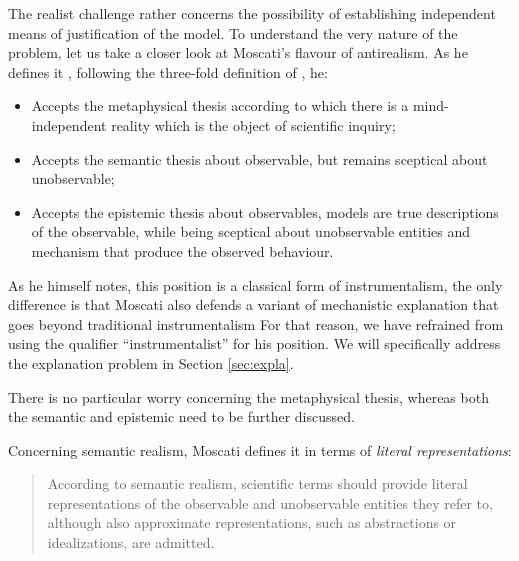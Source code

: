 \documentclass[a4paper,11pt]{article}
\theoremstyle{definition}
\begin{document}
The realist challenge rather concerns the possibility of establishing independent means of justification of the model. To understand the very nature of the problem, let us take a closer look at Moscati's flavour of antirealism. As he defines it \citep[pp.~18-20]{Moscati2023}, following the three-fold definition of \citep{Psillos1999}, he:

\begin{itemize}
    \item Accepts the metaphysical thesis according to which there is a mind-independent reality which is the object of scientific inquiry;
    \item Accepts the semantic thesis about observable, but remains sceptical about unobservable;
    \item Accepts the epistemic thesis about observables, models are true descriptions of the observable, while being sceptical about unobservable entities and mechanism that produce the observed behaviour.
\end{itemize}

As he himself notes, this position is a classical form of instrumentalism, the only difference is that Moscati also defends a variant of mechanistic explanation that goes beyond traditional instrumentalism For that reason, we have refrained from using the qualifier ``instrumentalist'' for his position. We will specifically address the explanation problem in Section \ref{sec:expla}.

There is no particular worry concerning the metaphysical thesis, whereas both the semantic and epistemic need to be further discussed.

Concerning semantic realism, Moscati defines it in terms of \textit{literal representations}:

\begin{quote}
    According to semantic realism, scientific terms should provide literal representations of the observable and unobservable entities they refer to, although also approximate representations, such as abstractions or idealizations, are admitted. \citep[p.~18]{Moscati2023}
\end{quote}
\end{document}
